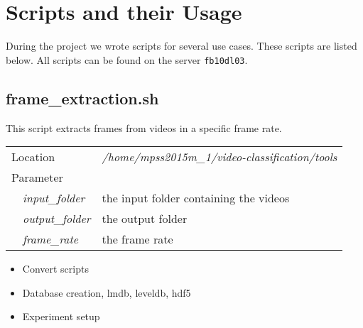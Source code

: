 \section{Scripts and their Usage}
\label{sec:scripts}

During the project we wrote scripts for several use cases.
These scripts are listed below.
All scripts can be found on the server \texttt{fb10dl03}.

\subsection{frame\_extraction.sh}
This script extracts frames from videos in a specific frame rate.

\begin{table}[ht]
\begin{tabular}{lll}
\multicolumn{2}{l}{Location}  & \textit{/home/mpss2015m\_1/video-classification/tools} \\
\multicolumn{2}{l}{Parameter} &                                        \\
        & \textit{input\_folder}       & the input folder containing the videos \\
        & \textit{output\_folder}      & the output folder                      \\
        & \textit{frame\_rate}         & the frame rate
\end{tabular}
\end{table}



\begin{itemize}
	\item Convert scripts
	\item Database creation, lmdb, leveldb, hdf5
	\item Experiment setup
\end{itemize}